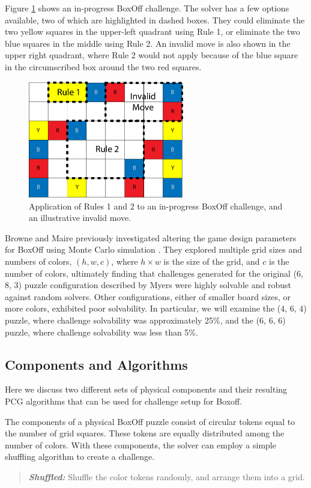 \documentclass[journal]{IEEEtran}
\begin{document}
Figure \ref{fig:boxoffrules} shows an in-progress BoxOff challenge. The solver has a few options available, two of which are highlighted in dashed boxes. They could eliminate the two yellow squares in the upper-left quadrant using Rule 1, or eliminate the two blue squares in the middle using Rule 2. An invalid move is also shown in the upper right quadrant, where Rule 2 would not apply because of the blue square in the circumscribed box around the two red squares.

\begin{figure}[t]
\centering
\includegraphics[width=6.8cm]{figure2.png}
\caption{Application of Rules 1 and 2 to an in-progress BoxOff challenge, and an illustrative invalid move.}
\label{fig:boxoffrules}
\end{figure}


Browne and Maire previously investigated altering the game design parameters for BoxOff using Monte Carlo simulation \cite{MCPUZZLE}. They explored multiple grid sizes and numbers of colors, $(h, w, c)$, where $h \times w$ is the size of the grid, and $c$ is the number of colors, ultimately finding that challenges generated for the original (6, 8, 3) puzzle configuration described by Myers were highly solvable and robust against random solvers. Other configurations, either of smaller board sizes, or more colors, exhibited poor solvability. In particular, we will examine the (4, 6, 4) puzzle, where challenge solvability was approximately 25\%, and the (6, 6, 6) puzzle, where challenge solvability was less than 5\%.

%
%
%
%
%
%

\subsection{Components and Algorithms}
\noindent
Here we discuss two different sets of physical components and their resulting PCG algorithms that can be used for challenge setup for Boxoff. 

The components of a physical BoxOff puzzle consist of circular tokens equal to the number of grid squares. These tokens are equally distributed among the number of colors. 
With these components, the solver can employ a simple shuffling algorithm to create a challenge.
\begin{quote}
    {\it \bf Shuffled:} Shuffle the color tokens randomly, and arrange them into a grid.
\end{quote}
\end{document}
